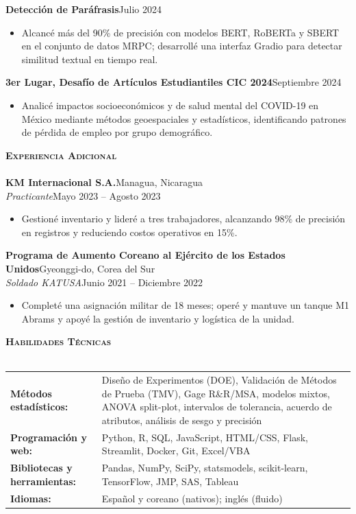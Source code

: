 \documentclass[a4paper]{article}
\newcommand{\lineunder}{
    \vspace*{-8pt} \\
    \hspace*{-18pt} \hrulefill \\
}
\newcommand{\header}[1]{
    \Needspace{4\baselineskip}
    {\hspace*{-18pt}\vspace*{5pt} \textsc{#1}}
    \vspace*{-6pt} \lineunder
}
\begin{document}
\textbf{Detección de Paráfrasis}\hfill Julio 2024
\begin{itemize}[noitemsep]
    \item Alcancé más del 90\% de precisión con modelos BERT, RoBERTa y SBERT en el conjunto de datos MRPC; desarrollé una interfaz Gradio para detectar similitud textual en tiempo real.
\end{itemize}

\textbf{3er Lugar, Desafío de Artículos Estudiantiles CIC 2024}\hfill Septiembre 2024
\begin{itemize}[noitemsep]
    \item Analicé impactos socioeconómicos y de salud mental del COVID-19 en México mediante métodos geoespaciales y estadísticos, identificando patrones de pérdida de empleo por grupo demográfico.
\end{itemize}

\vspace*{1mm}
\header{\textbf{Experiencia Adicional}}
\textbf{KM Internacional S.A.}\hfill Managua, Nicaragua\\
\textit{Practicante}\hfill Mayo 2023 -- Agosto 2023
\begin{itemize}[noitemsep]
    \item Gestioné inventario y lideré a tres trabajadores, alcanzando 98\% de precisión en registros y reduciendo costos operativos en 15\%.
\end{itemize}

\textbf{Programa de Aumento Coreano al Ejército de los Estados Unidos}\hfill Gyeonggi-do, Corea del Sur\\
\textit{Soldado KATUSA}\hfill Junio 2021 -- Diciembre 2022
\begin{itemize}[noitemsep]
    \item Completé una asignación militar de 18 meses; operé y mantuve un tanque M1 Abrams y apoyé la gestión de inventario y logística de la unidad.
\end{itemize}

\vspace*{1mm}
\header{\textbf{Habilidades Técnicas}}
\begin{tabular}{@{}l >{\raggedright\arraybackslash}p{}@{}}
\textbf{Métodos estadísticos:} & Diseño de Experimentos (DOE), Validación de Métodos de Prueba (TMV), Gage R\&R/MSA, modelos mixtos, ANOVA split-plot, intervalos de tolerancia, acuerdo de atributos, análisis de sesgo y precisión\\
\textbf{Programación y web:} & Python, R, SQL, JavaScript, HTML/CSS, Flask, Streamlit, Docker, Git, Excel/VBA\\
\textbf{Bibliotecas y herramientas:} & Pandas, NumPy, SciPy, statsmodels, scikit-learn, TensorFlow, JMP, SAS, Tableau\\
\textbf{Idiomas:} & Español y coreano (nativos); inglés (fluido)
\end{tabular}
\end{document}
